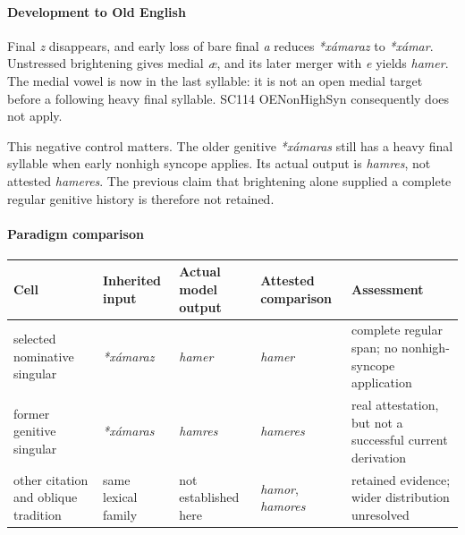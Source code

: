 \documentclass[
  british,
  a4paper,
]{article}
\newcounter{none} %
\providecommand{\Recon}[1]{\emph{*#1}}
\begin{document}
\paragraph{Development to Old
English}\label{development-to-old-english-86}

Final \emph{z} disappears, and early loss of bare final \emph{a} reduces
\Recon{xámaraz} to \Recon{xámar}. Unstressed brightening gives medial
\emph{æ}, and its later merger with \emph{e} yields {\emph{hamer}}. The
medial vowel is now in the last syllable: it is not an open medial
target before a following heavy final syllable. SC114 OENonHighSyn
consequently does not apply.

This negative control matters. The older genitive \Recon{xámaras} still
has a heavy final syllable when early nonhigh syncope applies. Its
actual output is \emph{hamres}, not attested {\emph{hameres}}. The
previous claim that brightening alone supplied a complete regular
genitive history is therefore not retained.

\paragraph{Paradigm comparison}\label{paradigm-comparison}

{\def\LTcaptype{none} %
\begin{longtable}[]{@{}
  >{\raggedright\arraybackslash}p{}
  >{\raggedright\arraybackslash}p{}
  >{\raggedright\arraybackslash}p{}
  >{\raggedright\arraybackslash}p{}
  >{\raggedright\arraybackslash}p{}@{}}
\toprule\noalign{}
\begin{minipage}[b]{\linewidth}\raggedright
Cell
\end{minipage} & \begin{minipage}[b]{\linewidth}\raggedright
Inherited input
\end{minipage} & \begin{minipage}[b]{\linewidth}\raggedright
Actual model output
\end{minipage} & \begin{minipage}[b]{\linewidth}\raggedright
Attested comparison
\end{minipage} & \begin{minipage}[b]{\linewidth}\raggedright
Assessment
\end{minipage} \\
\midrule\noalign{}
\endhead
\bottomrule\noalign{}
\endlastfoot
selected nominative singular & \Recon{xámaraz} & {\emph{hamer}} &
{\emph{hamer}} & complete regular span; no nonhigh-syncope
application \\
former genitive singular & \Recon{xámaras} & \emph{hamres} &
{\emph{hameres}} & real attestation, but not a successful current
derivation \\
other citation and oblique tradition & same lexical family & not
established here & {\emph{hamor}}, {\emph{hamores}} & retained evidence;
wider distribution unresolved \\
\end{longtable}
}
\end{document}

